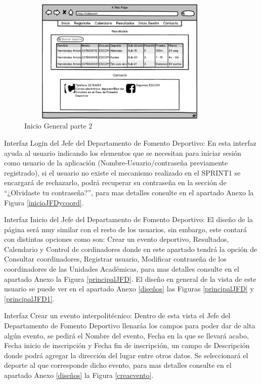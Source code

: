 	\begin{figure}[hbt!]
		\centering
		\includegraphics[width=10cm, height=6cm]{Imagenes/Disenos/Iniciogeneral1}
		\caption{Inicio General parte 2}
		\label{inicioGeneral1}
	\end{figure}
	
	\noindent Interfaz Login del Jefe del Departamento de Fomento Deportivo: En esta interfaz ayuda al usuario indicando los elementos que se necesitan para iniciar sesión como usuario de la aplicación (Nombre-Usuario/contraseña previamente registrado), si el usuario no existe el mecanismo realizado en el SPRINT1 se encargará de rechazarlo, podrá recuperar su contraseña en la sección de “¿Olvidaste tu contraseña?”, para mas detalles consulte en el apartado Anexo la Figura 	\ref{inicioJFDycoord}. 
	\newline
	
	\noindent Interfaz Inicio del Jefe del Departamento de Fomento Deportivo: El diseño de la página será muy similar con el resto de los usuarios, sin embargo, este contará con distintas opciones como son: Crear un evento deportivo, Resultados, Calendario y Control de cordinadores donde en este apartado tendrá la opción de Consultar coordinadores, Registrar usuario, Modificar contraseña de los coordinadores de las Unidades Académicas, para mas detalles consulte en el apartado Anexo la Figura 	\ref{principalJFD}. El diseño en general de la vista de este usuario se puede ver en el apartado Anexo \ref{diseños} las Figuras \ref{principalJFD} y \ref{principalJFD1}.
	\newline
	
	\noindent Interfaz Crear un evento interpolitécnico: Dentro de esta vista el Jefe del Departamento de Fomento Deportivo llenaráa los campos para poder dar de alta algún evento, se pedirá el Nombre del evento, Fecha en la que se llevará acabo, Fecha inicio de inscripción y Fecha fin de inscripción, un campo de Descripción donde podrá agregar la dirección del lugar entre otros datos. Se seleccionará el deporte al que corresponde dicho evento, para mas detalles consulte en el apartado Anexo \ref{diseños} la Figura \ref{creaevento}.
	\newline
	
